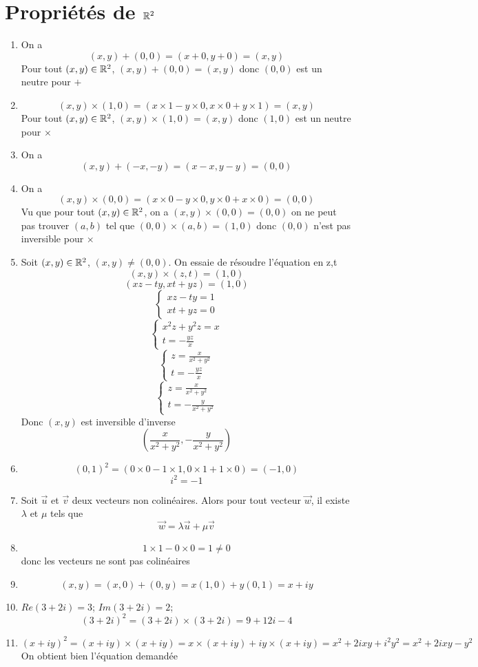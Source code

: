 \section{Propriétés de $\mathbb{R}^2$}
\begin{enumerate}
\item On a $$(x,y) + (0,0) = (x+0,y+0) = (x,y)$$
Pour tout $(x,y)\in\mathbb{R}^2$, $(x,y) + (0,0) = (x,y)$ donc $(0,0)$ est un neutre pour $+$
\item $$(x,y) \times (1,0) = (x\times 1 - y\times 0,x\times 0 + y\times 1) = (x,y)$$
Pour tout $(x,y)\in\mathbb{R}^2$, $(x,y) \times (1,0) = (x,y)$ donc $(1,0)$ est un neutre pour $\times$
\item On a $$(x,y) + (-x,-y) = (x-x,y-y) = (0,0)$$
\item On a $$(x,y) \times (0,0) = (x\times 0 - y \times 0,y\times 0 + x \times 0) = (0,0)$$
Vu que pour tout $(x,y)\in\mathbb{R}^2$, on a $(x,y)\times(0,0) = (0,0)$ on ne peut pas trouver $(a,b)$ tel que $(0,0)\times (a,b) = (1,0)$ donc $(0,0)$ n'est pas inversible pour $\times$
\item Soit $(x,y)\in \mathbb{R}^2$, $(x,y) \neq (0,0)$. On essaie de résoudre l'équation en z,t
$$(x,y) \times (z,t) = (1,0)$$
$$(xz-ty,xt+yz) = (1,0)$$
$$\left\{ \begin{array}{l}xz-ty = 1\\ xt+yz = 0 \end{array} \right.$$
$$\left\{ \begin{array}{l}x^2z+y^2z = x\\ t = - \frac{yz}{x} \end{array} \right.$$
$$\left\{ \begin{array}{l}z = \frac{x}{x^2+y^2}\\ t = - \frac{yz}{x} \end{array} \right.$$
$$\left\{ \begin{array}{l}z = \frac{x}{x^2+y^2}\\ t = - \frac{y}{x^2+y^2} \end{array} \right.$$
Donc $(x,y)$ est inversible d'inverse $$\boxed{(\frac{x}{x^2+y^2},- \frac{y}{x^2+y^2})}$$
\item $$(0,1)^2 = (0\times 0 - 1\times 1, 0\times 1 + 1\times 0) =(-1,0)$$
$$\boxed{i^2 = -1}$$
\item Soit $\vec{u}$ et $\vec{v}$ deux vecteurs non colinéaires. Alors pour tout vecteur $\vec{w}$, il existe $\lambda$ et $\mu$ tels que 
$$\vec{w} = \lambda \vec{u} + \mu \vec{v}$$
\item $$1\times 1 - 0\times 0 = 1 \neq 0$$ donc les vecteurs ne sont pas colinéaires
\item $$(x,y) = (x,0) + (0,y) = x(1,0) + y(0,1) = x +iy$$
\item $Re(3+2i) = 3$; $Im(3+2i) = 2$; $$(3+2i)^2 = (3+2i)\times(3+2i) = 9 +12i -4$$
\item $$(x+iy)^2 = (x+iy)\times(x+iy) = x\times(x+iy) + iy\times(x+iy) = x^2 + 2ixy +i^2y^2 = x^2 + 2ixy - y^2$$
On obtient bien l'équation demandée
\end{enumerate}
